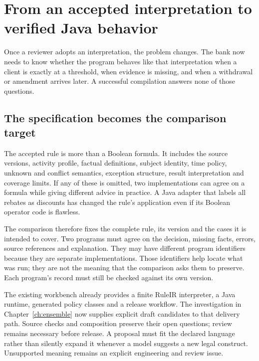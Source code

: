 \chapter{From an accepted interpretation to verified Java behavior}
\label{ch:verification}

Once a reviewer adopts an interpretation, the problem changes. The bank now
needs to know whether the program behaves like that interpretation when a client
is exactly at a threshold, when evidence is missing, and when a withdrawal or
amendment arrives later. A successful compilation answers none of those
questions.

\section{The specification becomes the comparison target}
\label{merge:M07:00}


The accepted rule is more than a Boolean formula. It includes the source
versions, activity profile, factual definitions, subject identity, time policy,
unknown and conflict semantics, exception structure, result interpretation and
coverage limits. If any of these is omitted, two implementations can agree on a
formula while giving different advice in practice. A Java adapter that labels
all rebates as discounts has changed the rule's application even if its Boolean
operator code is flawless.


The comparison therefore fixes the complete rule, its version and the cases it
is intended to cover. Two programs must agree on the decision, missing facts,
errors, source references and explanation. They may have different program
identifiers because they are separate implementations. Those identifiers help
locate what was run; they are not the meaning that the comparison asks them to
preserve. Each program's record must still be checked against its own version.

The existing workbench already provides a finite RuleIR interpreter, a Java
runtime, generated policy classes and a release workflow. The investigation
in Chapter~\ref{ch:ensemble} now supplies explicit draft candidates to that
delivery path. Source checks and composition preserve their open questions;
review remains necessary before release. A proposal must fit the declared
language rather than silently expand it whenever a model suggests a new legal
construct. Unsupported meaning remains an explicit engineering and review issue.

